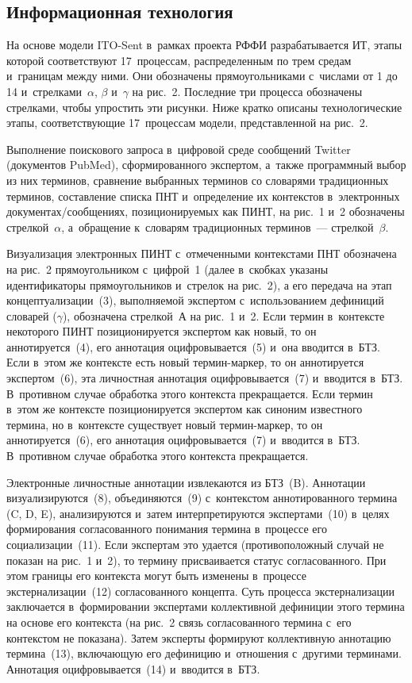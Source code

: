 \begin{multicols}{2}
\section{Информационная технология}

  На основе модели ITO-Sent в~рамках проекта РФФИ разрабатывается 
ИТ, этапы которой соответствуют 17~процессам, 
распределенным по трем средам и~границам между ними. Они обозначены 
прямоугольниками с~числами от 1 до 14 и~стрелками~$\alpha$, $\beta$ и~$\gamma$ 
на рис.~2. Последние три процесса обозначены стрелками, чтобы упростить эти 
рисунки. Ниже кратко описаны технологические этапы, соответствующие 
17~процессам модели, представленной на рис.~2.
  
  Выполнение поискового запроса в~цифровой среде сообщений Twitter 
(документов PubMed), сформированного экспертом, а~также про\-грам\-мный выбор 
из них терминов, сравнение выбранных терминов со словарями традиционных 
терминов, составление списка ПНТ и~определение их контекстов в~электронных  
до\-ку\-мен\-тах/со\-об\-ще\-ни\-ях, позиционируемых как ПИНТ, на рис.~1 и~2 
обозначены стрелкой~$\alpha$, а~обращение к~словарям традиционных 
терминов~--- стрелкой~$\beta$.
  
  Визуализация электронных ПИНТ с~отмеченными контекстами ПНТ обозначена 
на рис.~2 прямоугольником с~цифрой~1 (далее в~скобках указаны 
идентификаторы прямоугольников и~стрелок на рис.~2), а его передача на этап 
концептуализации~(3), выполняемой экспертом с~использованием дефиниций 
словарей ($\gamma$), обозначена стрелкой~А на рис.~1 и~2. Если термин 
в~контексте некоторого ПИНТ позиционируется экспертом как новый, то он 
аннотируется~(4), его аннотация оцифровывается~(5) и~она вводится в~БТЗ. Если 
в~этом же контексте есть новый термин-маркер, то он аннотируется экспертом~(6), 
эта личностная аннотация оцифровывается~(7) и~вводится в~БТЗ. В~противном 
случае обработка этого контекста прекращается. Если термин в~этом же контексте 
позиционируется экспертом как синоним известного термина, но в~контексте 
существует новый тер\-мин-мар\-кер, то он аннотируется~(6), его аннотация 
оцифровывается~(7) и~вводится в~БТЗ. В~противном случае обработка этого 
контекста прекращается.
  
  Электронные личностные аннотации извлекаются из БТЗ~(B). Аннотации 
визуализируются~(8), объединяются~(9) с~контекстом аннотированного термина 
(C, D, E), анализируются и~затем интерпретируются экспертами~(10) в~целях 
формирования согласованного понимания термина в~процессе его 
социализации~(11). Если экспертам это удается (противоположный случай не 
показан на рис.~1 и~2), то термину присваивается статус согласованного. При 
этом границы его контекста могут быть изменены в~процессе 
экстернализации~(12) согласованного концепта. Суть процесса экстернализации 
заключается в~формировании экспертами коллективной дефиниции этого термина 
на основе его контекста (на рис.~2 связь согласованного термина с~его контекстом 
не показана). Затем эксперты формируют коллективную аннотацию термина~(13), 
включающую его дефиницию и~отношения с~другими терминами. Аннотация 
оцифровывается~(14) и~вводится в~БТЗ.
  

\end{multicols}
